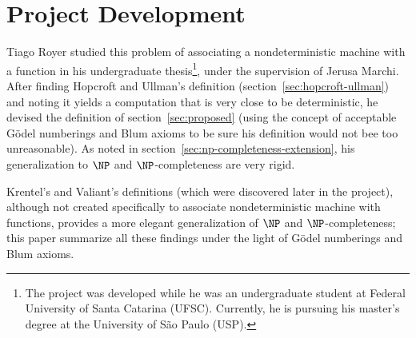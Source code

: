 \documentclass[12pt]{article}
\theoremstyle{definition}
\begin{document}
\section{Project Development}
\label{sec:development}

Tiago Royer studied this problem of associating a nondeterministic machine
with a function in his undergraduate thesis\footnote{
    The project was developed while he was an undergraduate student
    at Federal University of Santa Catarina (UFSC).
    Currently, he is pursuing his master's degree
    at the University of São Paulo (USP).
},
under the supervision of Jerusa Marchi.
After finding Hopcroft and Ullman's definition
(section~\ref{sec:hopcroft-ullman})
and noting it yields a computation that is very close to be deterministic,
he devised the definition of section~\ref{sec:proposed}
(using the concept of acceptable Gödel numberings and Blum axioms
to be sure his definition would not bee too unreasonable).
As noted in section~\ref{sec:np-completeness-extension},
his generalization to $\NP$ and $\NP$-completeness are very rigid.

Krentel's and Valiant's definitions
(which were discovered later in the project),
although not created specifically to associate nondeterministic machine with functions,
provides a more elegant generalization of $\NP$ and $\NP$-completeness;
this paper summarize all these findings
under the light of Gödel numberings and Blum axioms.



\end{document}

